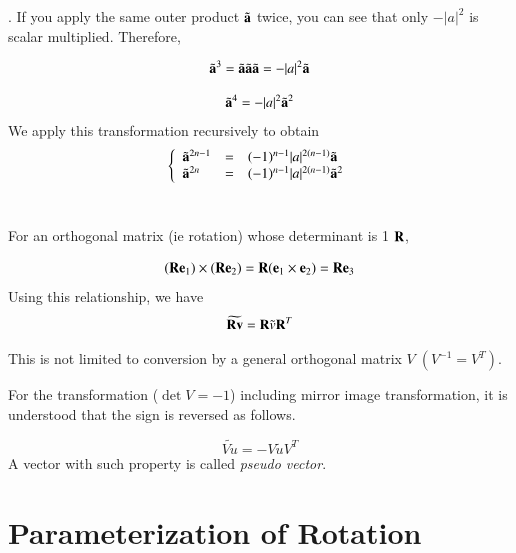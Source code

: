 . If you apply the same outer product $\tilde{\mathbf{a}}$ twice, you can see that only $-|a|^2$ is scalar multiplied. Therefore,

\begin{equation}
\tilde{\mathbf{a}}^3=\tilde{\mathbf{a}}\tilde{\mathbf{a}}\tilde{\mathbf{a}}=-|a|^2\tilde{\mathbf{a}}
\end{equation}


\begin{equation}
\tilde{\mathbf{a}}^4=-|a|^2\tilde{\mathbf{a}}^2
\end{equation}
We apply this transformation recursively to obtain
%
\begin{eqnarray}
\left\{\begin{array}{lll}\tilde{\mathbf{a}}^{2n-1}&=&(-1)^{n-1}|a|^{2(n-1)}\tilde{\mathbf{a}}\\ \tilde{\mathbf{a}}^{2n}&=&(-1)^{n-1}|a|^{2(n-1)}\tilde{\mathbf{a}}^2\end{array}\right.
\end{eqnarray}
\ \ \ \


For an orthogonal matrix (ie rotation) whose determinant is 1 $\mathbf{R}$,

\begin{equation}
(\mathbf{R}\mathbf{e}_1)\times (\mathbf{R}\mathbf{e}_2) = \mathbf{R}(\mathbf{e}_1\times\mathbf{e}_2) = \mathbf{R}\mathbf{e}_3
\end{equation}
%
Using this relationship, we have
%
\begin{equation}
\widetilde{\mathbf{R}\mathbf{v}} = \mathbf{R}\tilde{v}\mathbf{R}^T
\end{equation}



This is not limited to conversion by a general orthogonal matrix $V\;(V^{-1} =V^T )$.

For the transformation ($\det V = -1$) including mirror image transformation, it is understood that the sign is reversed as follows.

\begin{equation}
\widetilde{Vu} = -V\tilde{u}V^T
\end{equation}
A vector with such property is called \emph{pseudo vector}.



\section{Parameterization of Rotation}

